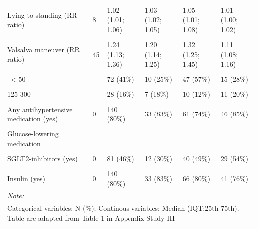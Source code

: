 \documentclass[
  a4paper,
  headsepline=true,
  open=left]{scrbook}
\begin{document}
\begin{landscape}
\begin{table}
{\begin{tabular}[t]{llllll}
Lying to standing (RR ratio) & 8 & 1.02 (1.01; 1.06) & 1.03 (1.02; 1.05) & 1.05 (1.01; 1.08) & 1.01 (1.00; 1.02)\\
\cellcolor{gray!6}{Deep breathing (RR ratio)} & \cellcolor{gray!6}{4} & \cellcolor{gray!6}{1.13 (1.07; 1.26)} & \cellcolor{gray!6}{1.15 (1.10; 1.28)} & \cellcolor{gray!6}{1.18 (1.11; 1.30)} & \cellcolor{gray!6}{1.07 (1.03; 1.08)}\\
Valsalva maneuver (RR ratio) & 45 & 1.24 (1.13; 1.36) & 1.20 (1.14; 1.25) & 1.32 (1.25; 1.45) & 1.11 (1.08; 1.16)\\
\cellcolor{gray!6}{NT-proBNP (pg/ml) categories} & \cellcolor{gray!6}{0} & \cellcolor{gray!6}{} & \cellcolor{gray!6}{} & \cellcolor{gray!6}{} & \cellcolor{gray!6}{}\\
\addlinespace
 < 50 &  & 72 (41\%) & 10 (25\%) & 47 (57\%) & 15 (28\%)\\
\cellcolor{gray!6}{ 50-124} & \cellcolor{gray!6}{} & \cellcolor{gray!6}{38 (22\%)} & \cellcolor{gray!6}{11 (28\%)} & \cellcolor{gray!6}{16 (20\%)} & \cellcolor{gray!6}{11 (20\%)}\\
125-300 &  & 28 (16\%) & 7 (18\%) & 10 (12\%) & 11 (20\%)\\
\cellcolor{gray!6}{> 300} & \cellcolor{gray!6}{} & \cellcolor{gray!6}{38 (22\%)} & \cellcolor{gray!6}{12 (30\%)} & \cellcolor{gray!6}{9 (11\%)} & \cellcolor{gray!6}{17 (31\%)}\\
Any antihypertensive medication (yes) & 0 & 140 (80\%) & 33 (83\%) & 61 (74\%) & 46 (85\%)\\
\addlinespace
\cellcolor{gray!6}{Beta-blockers (yes)} & \cellcolor{gray!6}{0} & \cellcolor{gray!6}{52 (30\%)} & \cellcolor{gray!6}{11 (28\%)} & \cellcolor{gray!6}{19 (23\%)} & \cellcolor{gray!6}{22 (41\%)}\\
Glucose-lowering medication &  &  &  &  & \\
\cellcolor{gray!6}{Metformin (yes)} & \cellcolor{gray!6}{0} & \cellcolor{gray!6}{123 (70\%)} & \cellcolor{gray!6}{26 (65\%)} & \cellcolor{gray!6}{56 (68\%)} & \cellcolor{gray!6}{41 (76\%)}\\
SGLT2-inhibitors (yes) & 0 & 81 (46\%) & 12 (30\%) & 40 (49\%) & 29 (54\%)\\
\cellcolor{gray!6}{GLP1 RAs (yes)} & \cellcolor{gray!6}{0} & \cellcolor{gray!6}{91 (52\%)} & \cellcolor{gray!6}{15 (38\%)} & \cellcolor{gray!6}{47 (57\%)} & \cellcolor{gray!6}{29 (54\%)}\\
\addlinespace
Insulin (yes) & 0 & 140 (80\%) & 33 (83\%) & 66 (80\%) & 41 (76\%)\\
\bottomrule
\multicolumn{6}{l}{\rule{0pt}{1em}\textit{Note: }}\\
\multicolumn{6}{l}{\rule{0pt}{1em}Categorical variables: N (\%); Continous variables: Median (IQT:25th-75th). Table are adapted from Table 1 in Appendix Study III}\\
\end{tabular}}
\endgroup{}
\end{table}
\end{landscape}
\end{document}
